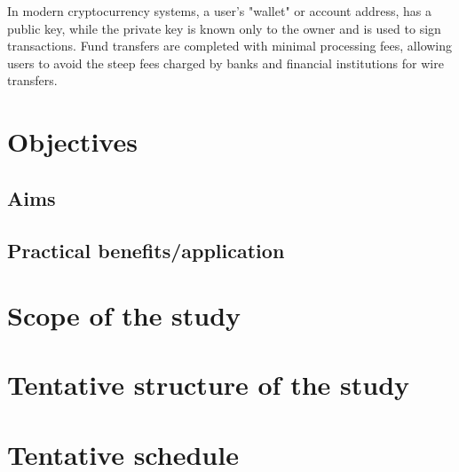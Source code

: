 In modern cryptocurrency systems, a user's "wallet" or account address, has a public key, while the private key is known only to the owner and is used to sign transactions. Fund transfers are completed with minimal processing fees, allowing users to avoid the steep fees charged by banks and financial institutions for wire transfers.





\section{Objectives}

\subsection{Aims}

\subsection{Practical benefits/application}

\section{Scope of the study}

\section{Tentative structure of the study}

\section{Tentative schedule}